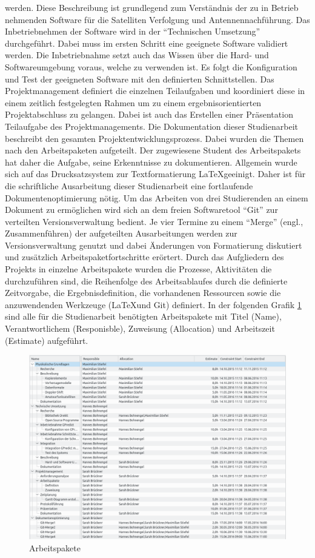 werden. Diese Beschreibung ist grundlegend zum Verständnis der zu in Betrieb nehmenden Software 
für die Satelliten Verfolgung und  Antennennachführung. Das Inbetriebnehmen der Software wird in der ``Technischen Umsetzung'' 
durchgeführt. Dabei muss im ersten Schritt eine geeignete Software validiert werden. Die 
Inbetriebnahme setzt auch das Wissen über die Hard- und Softwareumgebung voraus, welche zu 
verwenden ist. Es folgt die Konfiguration und Test der geeigneten Software mit den definierten 
Schnittstellen.
\newpar
Das Projektmanagement definiert die einzelnen Teilaufgaben und koordiniert diese in einem zeitlich 
festgelegten Rahmen um zu einem ergebnisorientierten Projektabschluss zu gelangen. Dabei ist auch 
das Erstellen einer Präsentation Teilaufgabe des Projektmanagements.
\newpar
Die Dokumentation dieser Studienarbeit beschreibt den gesamten Projektentwicklungsprozess. Dabei wurden die Themen nach den Arbeitspaketen 
aufgeteilt. Der zugewiesene Student des Arbeitspakets hat daher die Aufgabe, seine Erkenntnisse zu dokumentieren. Allgemein wurde sich 
auf das Drucksatzsystem zur Textformatierung \LaTeX geeinigt. Daher ist für die schriftliche Ausarbeitung dieser Studienarbeit eine 
fortlaufende Dokumentenoptimierung nötig. Um das Arbeiten von drei Studierenden an einem Dokument zu ermöglichen wird sich an dem freien 
Softwaretool ``Git'' zur verteilten Versionsverwaltung bedient. Je vier Termine zu einem ``Merge'' (engl., Zusammenführen) der 
aufgeteilten Ausarbeitungen werden zur Versionsverwaltung genutzt und dabei Änderungen von Formatierung diskutiert und zusätzlich 
Arbeitspaketfortschritte erörtert. 
\newpar
Durch das Aufgliedern des Projekts in einzelne Arbeitspakete wurden die Prozesse, Aktivitäten die durchzuführen sind, die Reihenfolge des 
Arbeitsablaufes durch die definierte Zeitvorgabe, die Ergebnisdefinition, die vorhandenen Ressourcen sowie die anzuwendenden Werkzeuge (\LaTeX und 
Git) definiert.  
In der folgenden Grafik \ref{fig:arbeitspaket} sind alle für die Studienarbeit benötigten 
Arbeitspakete mit Titel (Name), Verantwortlichem (Responisble), Zuweisung (Allocation) und 
Arbeitszeit (Estimate) aufgeführt.
\begin{figure}[h] 
 \centering
\includegraphics[width=1.0\linewidth]{./images/03task}
\caption{Arbeitspakete}
 \label{fig:arbeitspaket}
\end{figure}
\newpage

